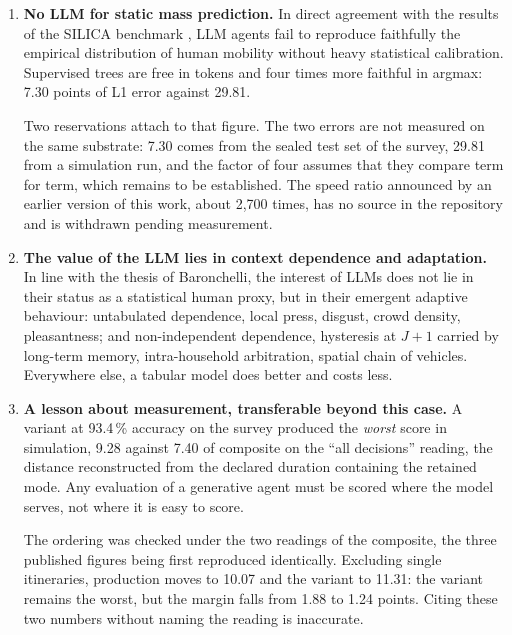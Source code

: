 \begin{enumerate}

\item \textbf{No LLM for static mass prediction.} In direct agreement with the results of the SILICA benchmark \citep{bintareaf2026silica}, LLM agents fail to reproduce faithfully the empirical distribution of human mobility without heavy statistical calibration. Supervised trees are free in tokens and four times more faithful in argmax: 7.30 points of L1 error against 29.81.

Two reservations attach to that figure. The two errors are not measured on the same substrate: 7.30 comes from the sealed test set of the survey, 29.81 from a simulation run, and the factor of four assumes that they compare term for term, which remains to be established. The speed ratio announced by an earlier version of this work, about 2{,}700 times, has no source in the repository and is withdrawn pending measurement.

\item \textbf{The value of the LLM lies in context dependence and adaptation.} In line with the thesis of Baronchelli, the interest of LLMs does not lie in their status as a statistical human proxy, but in their emergent adaptive behaviour: untabulated dependence, local press, disgust, crowd density, pleasantness; and non-independent dependence, hysteresis at $J+1$ carried by long-term memory, intra-household arbitration, spatial chain of vehicles. Everywhere else, a tabular model does better and costs less.

\item \textbf{A lesson about measurement, transferable beyond this case.} A variant at 93.4\,\% accuracy on the survey produced the \emph{worst} score in simulation, 9.28 against 7.40 of composite on the ``all decisions'' reading, the distance reconstructed from the declared duration containing the retained mode. Any evaluation of a generative agent must be scored where the model serves, not where it is easy to score.

The ordering was checked under the two readings of the composite, the three published figures being first reproduced identically. Excluding single itineraries, production moves to 10.07 and the variant to 11.31: the variant remains the worst, but the margin falls from 1.88 to 1.24 points. Citing these two numbers without naming the reading is inaccurate.


\end{enumerate}
